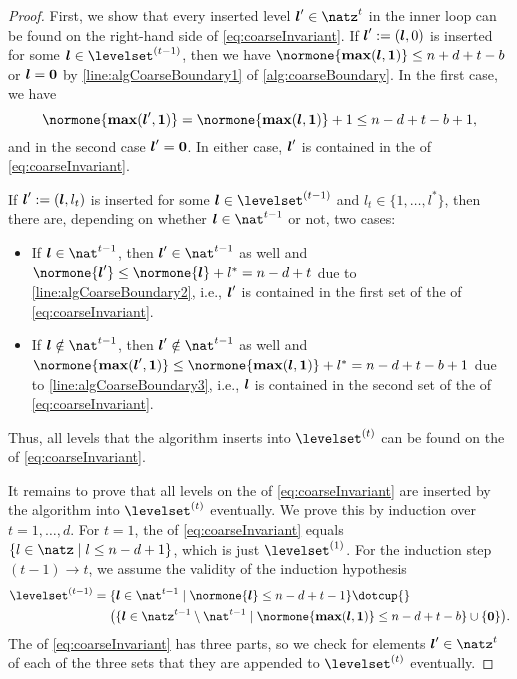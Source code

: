 \begin{proof}
  First, we show that every inserted level $\*l' \in \natz^t$ in the inner loop
  can be found on the right-hand side of \eqref{eq:coarseInvariant}.
  If ${\boldsymbol{l}}' := ({\boldsymbol{l}}, 0)$
  is inserted for some $\*l \in \levelset^{(t-1)}$,
  then we have $\normone{\vecmax(\*l, \*1)} \le n+d+t-b$ or
  ${\boldsymbol{l}} = {\boldsymbol{0}}$ by \cref{line:algCoarseBoundary1} of
  \cref{alg:coarseBoundary}.
  In the first case, we have
  \begin{equation}
    \normone{\vecmax(\*l', \*1)}
    = \normone{\vecmax(\*l, \*1)} + 1
    \le n - d + t - b + 1,
  \end{equation}
  and in the second case ${\boldsymbol{l}}' = {\boldsymbol{0}}$.
  In either case, ${\boldsymbol{l}}'$ is contained in the \rhs of
  \eqref{eq:coarseInvariant}.
  
  If ${\boldsymbol{l}}' := ({\boldsymbol{l}}, l_t)$ is inserted
  for some $\*l \in \levelset^{(t-1)}$ and
  $l_t \in \{1, \dotsc, l^\ast\}$, then there are,
  depending on whether $\*l \in \nat^{t-1}$ or not, two cases:
  \begin{itemize}
    \item
    If $\*l \in \nat^{t-1}$, then $\*l' \in \nat^{t-1}$ as well and
    $\normone{\*l'} \le \normone{\*l} + l^\ast = n - d + t$
    due to \cref{line:algCoarseBoundary2},
    i.e., ${\boldsymbol{l}}'$ is contained in the first set of the \rhs of
    \eqref{eq:coarseInvariant}.
    
    \item
    If $\*l \notin \nat^{t-1}$, then $\*l' \notin \nat^{t-1}$ as well and
    $\normone{\vecmax(\*l', \*1)}
    \le \normone{\vecmax(\*l, \*1)} + l^\ast
    = n - d + t - b + 1$
    due to \cref{line:algCoarseBoundary3},
    i.e., ${\boldsymbol{l}}$ is contained in the second set of the \rhs of
    \eqref{eq:coarseInvariant}.
  \end{itemize}
  Thus, all levels that the algorithm inserts into $\levelset^{(t)}$
  can be found on the \rhs of \eqref{eq:coarseInvariant}.
  
  It remains to prove that all levels on the \rhs of
  \eqref{eq:coarseInvariant}
  are inserted by the algorithm into $\levelset^{(t)}$ eventually.
  We prove this by induction over $t = 1, \dotsc, d$.
  For $t = 1$, the \rhs of \eqref{eq:coarseInvariant} equals
  $\{l \in \natz \mid l \le n-d+1\}$, which is just $\levelset^{(1)}$.
  For the induction step $(t - 1) \to t$, we assume
  the validity of the induction hypothesis
  \begin{equation}
    \label{eq:proofCoarseInductionHypothesis}
    \begin{aligned}
      \levelset^{(t-1)}
      &= \{\*l \in \nat^{t-1} \mid
      \normone{\*l} \le n-d+t-1\} \dotcup {}\\
      &\hphantom{{}={}}
      \paren*{
        \{\*l \in \natz^{t-1} \setminus \nat^{t-1} \mid
        \normone{\vecmax(\*l, \*1)} \le n-d+t-b\} \cup
        \{\vec{0}\}
      }.
    \end{aligned}
  \end{equation}
  The \rhs of \eqref{eq:coarseInvariant} has three parts,
  so we check for elements $\*l' \in \natz^t$
  of each of the three sets that they are appended to $\levelset^{(t)}$
  eventually.
  

\end{proof}
